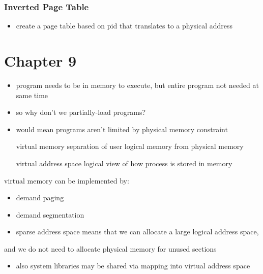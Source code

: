 \documentclass[11pt]{article}
\begin{document}
\subsubsection{Inverted Page Table}
\label{sec:org55cf5f6}
\begin{itemize}
\item create a page table based on pid that translates to a physical address
\end{itemize}
\section{Chapter 9}
\label{sec:orgfe94637}
\begin{itemize}
\item program needs to be in memory to execute, but entire program not needed at same time
\item so why don't we partially-load programs?
\item would mean programs aren't limited by physical memory constraint
\item[{virtual memory}] separation of user logical memory from physical memory
\item[{virtual address space}] logical view of how process is stored in memory
\end{itemize}
virtual memory can be implemented by:
\begin{itemize}
\item demand paging
\item demand segmentation
\end{itemize}
\begin{itemize}
\item sparse address space means that we can allocate a large logical address space,
\end{itemize}
and we do not need to allocate physical memory for unused sections
\begin{itemize}
\item also system libraries may be shared via mapping into virtual address space
\end{itemize}
\end{document}
